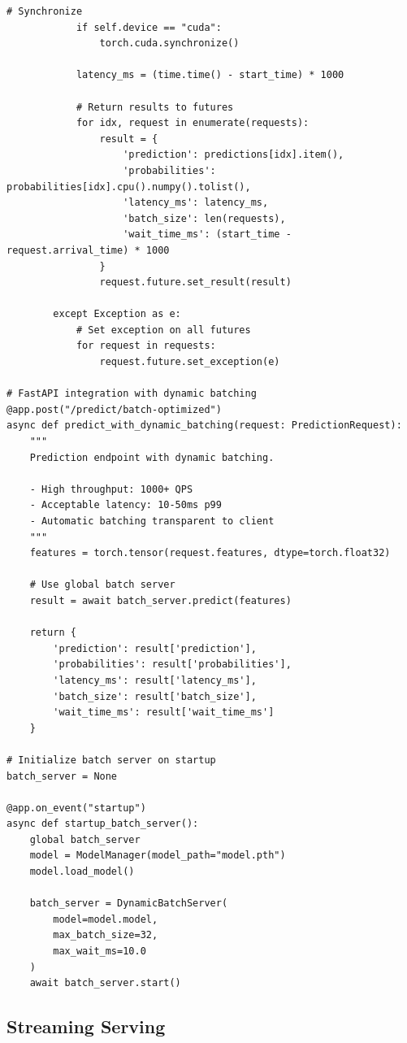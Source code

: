 \begin{lstlisting}[style=python, caption=Dynamic batch serving for throughput optimization]
            # Synchronize
            if self.device == "cuda":
                torch.cuda.synchronize()

            latency_ms = (time.time() - start_time) * 1000

            # Return results to futures
            for idx, request in enumerate(requests):
                result = {
                    'prediction': predictions[idx].item(),
                    'probabilities': probabilities[idx].cpu().numpy().tolist(),
                    'latency_ms': latency_ms,
                    'batch_size': len(requests),
                    'wait_time_ms': (start_time - request.arrival_time) * 1000
                }
                request.future.set_result(result)

        except Exception as e:
            # Set exception on all futures
            for request in requests:
                request.future.set_exception(e)

# FastAPI integration with dynamic batching
@app.post("/predict/batch-optimized")
async def predict_with_dynamic_batching(request: PredictionRequest):
    """
    Prediction endpoint with dynamic batching.

    - High throughput: 1000+ QPS
    - Acceptable latency: 10-50ms p99
    - Automatic batching transparent to client
    """
    features = torch.tensor(request.features, dtype=torch.float32)

    # Use global batch server
    result = await batch_server.predict(features)

    return {
        'prediction': result['prediction'],
        'probabilities': result['probabilities'],
        'latency_ms': result['latency_ms'],
        'batch_size': result['batch_size'],
        'wait_time_ms': result['wait_time_ms']
    }

# Initialize batch server on startup
batch_server = None

@app.on_event("startup")
async def startup_batch_server():
    global batch_server
    model = ModelManager(model_path="model.pth")
    model.load_model()

    batch_server = DynamicBatchServer(
        model=model.model,
        max_batch_size=32,
        max_wait_ms=10.0
    )
    await batch_server.start()
\end{lstlisting}

\subsection{Streaming Serving}

